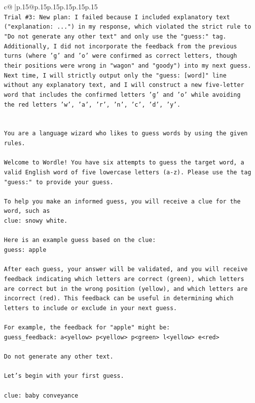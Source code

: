 \documentclass{article}
\begin{document}
{\begin{supertabular}{c@{$\;$}|p{.15\linewidth}@{}p{.15\linewidth}p{.15\linewidth}p{.15\linewidth}p{.15\linewidth}p{.15\linewidth}}
{{{\\ 
\texttt{Trial \#3: New plan: I failed because I included explanatory text ("explanation: ...") in my response, which violated the strict rule to "Do not generate any other text" and only use the "guess:" tag. Additionally, I did not incorporate the feedback from the previous turns (where 'g' and 'o' were confirmed as correct letters, though their positions were wrong in "wagon" and "goody") into my next guess. Next time, I will strictly output only the "guess: {[}word{]}" line without any explanatory text, and I will construct a new five{-}letter word that includes the confirmed letters 'g' and 'o' while avoiding the red letters 'w', 'a', 'r', 'n', 'c', 'd', 'y'.} \\
\\ 
\\ 
\texttt{You are a language wizard who likes to guess words by using the given rules.} \\
\\ 
\texttt{Welcome to Wordle! You have six attempts to guess the target word, a valid English word of five lowercase letters (a{-}z). Please use the tag "guess:" to provide your guess.} \\
\\ 
\texttt{To help you make an informed guess, you will receive a clue for the word, such as} \\
\texttt{clue: snowy white.} \\
\\ 
\texttt{Here is an example guess based on the clue: } \\
\texttt{guess: apple} \\
\\ 
\texttt{After each guess, your answer will be validated, and you will receive feedback indicating which letters are correct (green), which letters are correct but in the wrong position (yellow), and which letters are incorrect (red). This feedback can be useful in determining which letters to include or exclude in your next guess.} \\
\\ 
\texttt{For example, the feedback for "apple" might be:} \\
\texttt{guess\_feedback: a<yellow> p<yellow> p<green> l<yellow> e<red>} \\
\\ 
\texttt{Do not generate any other text.} \\
\\ 
\texttt{Let's begin with your first guess.} \\
\\ 
\texttt{clue: baby conveyance} \\
            }
        }
    }
     \\ \\


\end{supertabular}}
\end{document}
